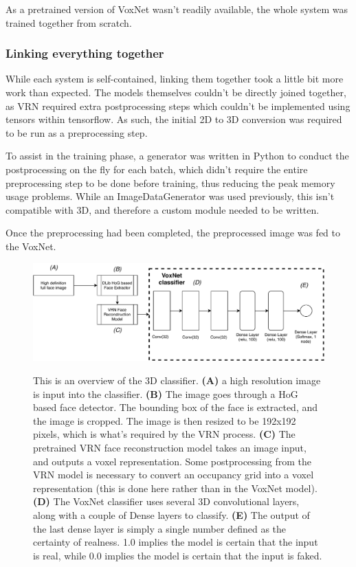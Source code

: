 \documentclass[10pt,a4paper]{article}
\begin{document}
            As a pretrained version of VoxNet wasn't readily available, the whole system was trained together from scratch.

        \subsubsection{Linking everything together}
            While each system is self-contained, linking them together took a little bit more work than expected. The models themselves couldn't be directly joined together,
            as VRN required extra postprocessing steps which couldn't be implemented using tensors within tensorflow. As such, the initial 2D to 3D conversion was required to be run
            as a preprocessing step.

            To assist in the training phase, a generator was written in Python to conduct the postprocessing on the fly for each batch, which didn't require the entire preprocessing step to be done before training, 
            thus reducing the peak memory usage problems. While an ImageDataGenerator was used previously, this isn't compatible with 3D, and therefore a custom module needed to be written.

            Once the preprocessing had been completed, the preprocessed image was fed to the VoxNet. 


            \begin{figure}
                \centering
                \includegraphics[width=\linewidth]{voxnet.pdf}
                \label{3DClassifierArchitectureDiagram}
                \caption{
                    This is an overview of the 3D classifier. \textbf{(A)} a high resolution image is input into the classifier. \textbf{(B)} The image goes through a HoG based face detector. The bounding box of the face is extracted, and the image is cropped. 
                    The image is then resized to be 192x192 pixels, which is what's required by the VRN process.
                    \textbf{(C)} The pretrained VRN face reconstruction model takes an image input, and outputs a voxel representation. Some postprocessing from the VRN model 
                    is necessary to convert an occupancy grid into a voxel representation (this is done here rather than in the VoxNet model).
                    \textbf{(D)} The VoxNet classifier uses several 3D convolutional layers, along with a couple of Dense layers to classify.
                    \textbf{(E)} The output of the last dense layer is simply a single number defined as the certainty of realness. 1.0 implies the model is certain that the input is real, while 0.0 implies the model is certain that the input is faked.
                }
            \end{figure}
\end{document}
